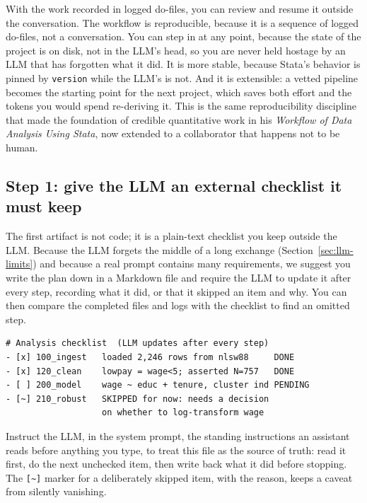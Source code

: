 \documentclass[
    a4paper,
    fontsize=10pt,
    twoside=true,
    numbers=noenddot,
]{kaobook}
\begin{document}
With the work recorded in logged do-files, you can review and resume it outside the conversation. The workflow is reproducible, because it is a sequence of logged do-files, not a conversation. You can step in at any point, because the state of the project is on disk, not in the LLM's head, so you are never held hostage by an LLM that has forgotten what it did. It is more stable, because Stata's behavior is pinned by \texttt{version} while the LLM's is not. And it is extensible: a vetted pipeline becomes the starting point for the next project, which saves both effort and the tokens you would spend re-deriving it. This is the same reproducibility discipline that \textcite{long2009workflow} made the foundation of credible quantitative work in his \emph{Workflow of Data Analysis Using Stata}, now extended to a collaborator that happens not to be human.

\subsection{Step 1: give the LLM an external checklist it must keep}
The first artifact is not code; it is a plain-text checklist you keep outside the LLM. Because the LLM forgets the middle of a long exchange (Section~\ref{sec:llm-limits}) and because a real prompt contains many requirements, we suggest you write the plan down in a Markdown file and require the LLM to update it after every step, recording what it did, or that it skipped an item and why. You can then compare the completed files and logs with the checklist to find an omitted step.

\begin{kaobox}[frametitle=The checklist the LLM maintains: \texttt{TODO.md}]
\par
{\footnotesize
\begin{verbatim}
# Analysis checklist  (LLM updates after every step)
- [x] 100_ingest   loaded 2,246 rows from nlsw88     DONE
- [x] 120_clean    lowpay = wage<5; asserted N=757   DONE
- [ ] 200_model    wage ~ educ + tenure, cluster ind PENDING
- [~] 210_robust   SKIPPED for now: needs a decision
                   on whether to log-transform wage
\end{verbatim}
}
Instruct the LLM, in the system prompt, the standing instructions an assistant reads before anything you type, to treat this file as the source of truth: read it first, do the next unchecked item, then write back what it did before stopping. The \texttt{[\textasciitilde]} marker for a deliberately skipped item, with the reason, keeps a caveat from silently vanishing.
\end{kaobox}
\end{document}
